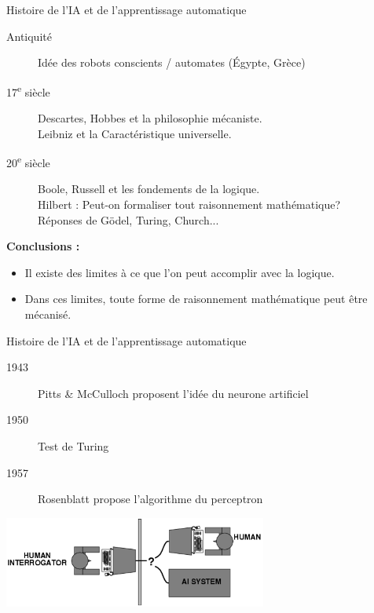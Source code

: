 \documentclass[french]{beamer}
\begin{document}
\begin{frame}{Histoire de l'IA et de l'apprentissage automatique}
\begin{description}

	\item[Antiquité] Idée des robots conscients / automates (Égypte, Grèce)
	\item[17\textsuperscript{e} siècle] Descartes, Hobbes et la philosophie mécaniste. \\ Leibniz et la Caractéristique universelle.
	\item[20\textsuperscript{e} siècle] Boole, Russell et les fondements de la logique. \\ Hilbert : Peut-on formaliser tout raisonnement mathématique? \\
										Réponses de Gödel, Turing, Church...
\end{description}
\textbf{Conclusions :}
\begin{itemize}
	\item Il existe des limites à ce que l'on peut accomplir avec la logique.
	\item Dans ces limites, toute forme de raisonnement mathématique peut être mécanisé.
\end{itemize}
\end{frame}

\begin{frame}{Histoire de l'IA et de l'apprentissage automatique}
\vspace{1cm}
\begin{changemargin}{-1cm}{-1cm} 
\begin{description}	
	\item [1943] Pitts \& McCulloch proposent l'idée du neurone artificiel \cite{mcculloch1943logical}
	\item [1950] Test de Turing \cite{turing1950computing}
	\item [1957] Rosenblatt propose l'algorithme du perceptron \cite{rosenblatt1958perceptron}
\end{description}
\vspace{1cm}
\begin{center}
\includegraphics[height=3cm]{figures/turing_test}
\end{center}
\end{changemargin} 
\end{frame}
\end{document}
